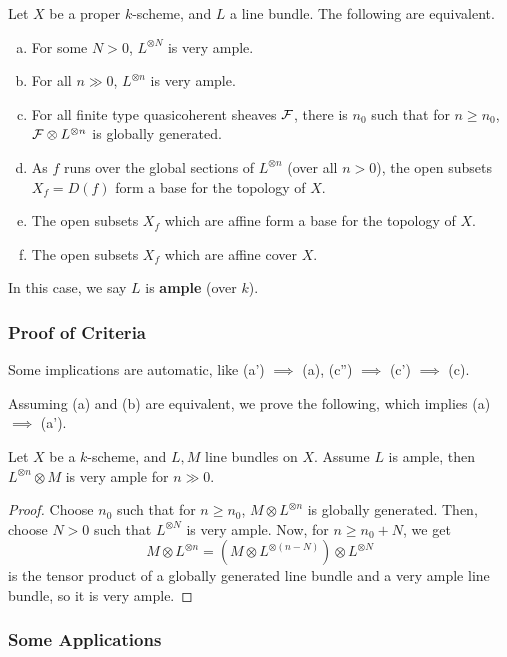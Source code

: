 \documentclass[12pt]{article}
\begin{document}
\begin{thm}
    Let $X$ be a proper $k$-scheme, and $L$ a line bundle. The following are equivalent.
    \begin{enumerate}[(a)]
        \item For some $N>0$, $L^{\otimes N}$ is very ample.
        \item[(a')] For all $n\gg 0$, $L^{\otimes n}$ is very ample.
        \item For all finite type quasicoherent sheaves $\mathcal{F}$, there is $n_0$ such that for $n\geq n_0$, $\mathcal{F}\otimes L^{\otimes n}$ is globally generated.
        \item As $f$ runs over the global sections of $L^{\otimes n}$ (over all $n>0$), the open subsets $X_f=D(f)$ form a base for the topology of $X$.
        \item[(c')] The open subsets $X_f$ which are affine form a base for the topology of $X$.
        \item[(c'')] The open subsets $X_f$ which are affine cover $X$.
    \end{enumerate}
    In this case, we say $L$ is \textbf{ample} (over $k$).
\end{thm}

\subsubsection{Proof of Criteria}

Some implications are automatic, like (a') $\implies$ (a), (c'') $\implies$ (c') $\implies$ (c).

Assuming (a) and (b) are equivalent, we prove the following, which implies (a) $\implies$ (a').
\begin{prop}
    Let $X$ be a $k$-scheme, and $L,M$ line bundles on $X$. Assume $L$ is ample, then $L^{\otimes n}\otimes M$ is very ample for $n\gg 0$.
\end{prop}
\begin{proof}
    Choose $n_0$ such that for $n\geq n_0$, $M\otimes L^{\otimes n}$ is globally generated. Then, choose $N>0$ such that $L^{\otimes N}$ is very ample. Now, for $n\geq n_0+N$, we get
    \[M\otimes L^{\otimes n} = (M\otimes L^{\otimes(n-N)})\otimes L^{\otimes N}\]
    is the tensor product of a globally generated line bundle and a very ample line bundle, so it is very ample.
\end{proof}


\subsubsection{Some Applications}
\end{document}
